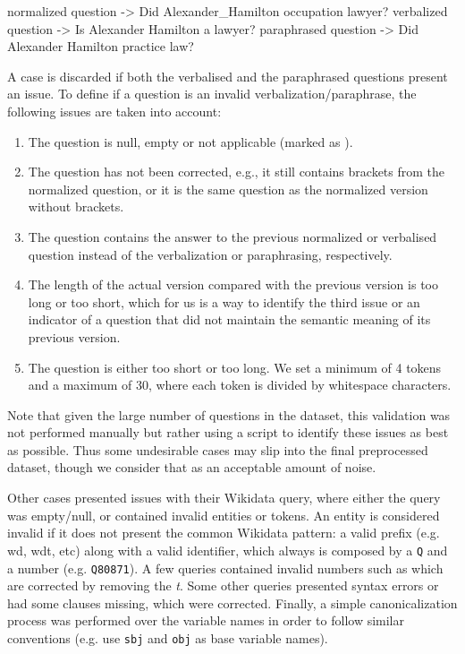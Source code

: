 \begin{sparqlcode}[%
    caption={Example of questions contained in one case of the \LCQuADtwo{} dataset.}, 
    label={lst:questionExampleLcquad2}]
normalized question  -> Did {Alexander_Hamilton} {occupation} {lawyer}?
verbalized question  -> Is Alexander Hamilton a lawyer?
paraphrased question -> Did Alexander Hamilton practice law?
\end{sparqlcode}

A case is discarded if both the verbalised and the paraphrased questions present an issue. To 
define if a question is an invalid verbalization/paraphrase, the following issues are taken 
into account:

\begin{enumerate}
    \item The question is null, empty or not applicable (marked as ). 
    \item The question has not been corrected, e.g., it still contains brackets from the normalized 
    question, or it is the same question as the normalized version without brackets.
    \item The question contains the answer to the previous normalized or verbalised question 
    instead of the verbalization or paraphrasing, respectively. 
    \item The length of the actual version compared with the previous version is too long or too 
    short, which for us is a way to identify the third issue or an indicator of a question that 
    did not maintain the semantic meaning of its previous version.
    \item The question is either too short or too long. We set a minimum of 4 tokens and a 
    maximum of 30, where each token is divided by whitespace characters.
\end{enumerate}

Note that given the large number of questions in the dataset, this validation was not performed 
manually but rather using a script to identify these issues as best as possible. Thus some 
undesirable cases may slip into the final preprocessed dataset, though we consider that as an 
acceptable amount of noise.

Other cases presented issues with their Wikidata \SPARQL{} query, where either the query was 
empty/null, or contained invalid entities or tokens. An entity is considered invalid if it does 
not present the common Wikidata pattern: a valid prefix (e.g. wd, wdt, etc) along with a valid 
identifier, which always is composed by a \texttt{Q} and a number (e.g. \texttt{Q80871}). A few 
queries contained invalid numbers such as  which are corrected by removing the 
\textit{t}. Some other queries presented syntax errors or had some clauses missing, which were 
corrected. Finally, a simple canonicalization process was performed over the variable names in 
order to follow similar conventions (e.g. use \texttt{sbj} and \texttt{obj} as base variable 
names).


